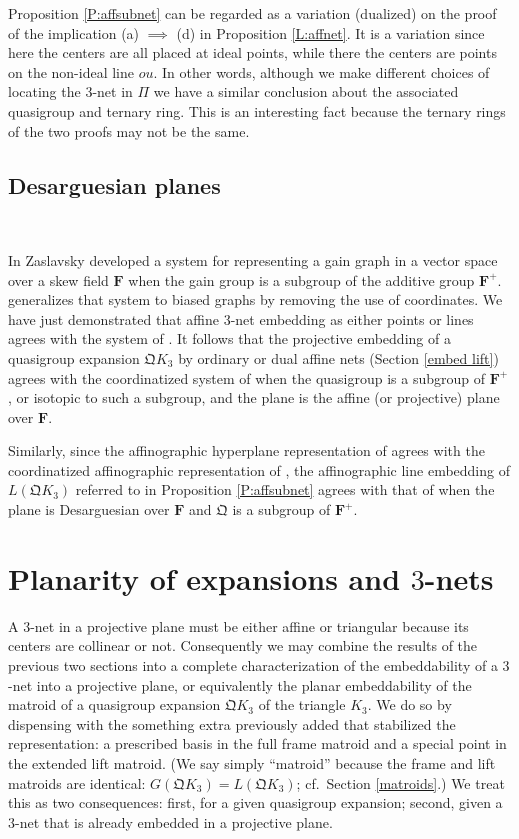 \documentclass[reqno,12pt]{amsart}
\newcommand \comment[1]{}				%
\theoremstyle{remark}
\numberwithin{equation}{section}
\numberwithin{figure}{section}
\newcommand\fF{\mathbf{F}}	%
\newcommand \fQ{\mathfrak Q}
\newcommand\PP{\Pi}	%
\newcommand\ortho{\cite[Section 3\comment{ortho}]{BG6} }		%
\newcommand\orthoaffino{\cite[Section 3.2\comment{orthoaffino}]{BG6} }	%
\begin{document}
Proposition \ref{P:affsubnet} can be regarded as a variation (dualized) on the proof of the implication (a) $\implies$ (d) in Proposition \ref{L:affnet}.  It is a variation since here the centers are all placed at ideal points, while there the centers are points on the non-ideal line $ou$.  In other words, although we make different choices of locating the $3$-net in $\PP$ we have a similar conclusion about the associated quasigroup and ternary ring.  This is an interesting fact because the ternary rings of the two proofs may not be the same.


\subsection{Desarguesian planes}\label{q desarglift}\

In \cite[Section IV.4.1]{BG} Zaslavsky developed a system for representing a gain graph in a vector space over a skew field $\fF$ when the gain group is a subgroup of the additive group $\fF^+$.  \ortho generalizes that system to biased graphs by removing the use of coordinates.  We have just demonstrated that affine $3$-net embedding as either points or lines agrees with the system of \ortho.  It follows that the projective embedding of a quasigroup expansion $\fQ K_3$ by ordinary or dual affine nets (Section \ref{embed lift}) agrees with the coordinatized system of \cite[Section IV.4.1]{BG} when the quasigroup is a subgroup of $\fF^+$, or isotopic to such a subgroup, and the plane is the affine (or projective) plane over $\fF$.

Similarly, since the affinographic hyperplane representation of \orthoaffino agrees with the coordinatized affinographic representation of \cite[Corollary IV.4.5]{BG}, the affinographic line embedding of $L(\fQ K_3)$ referred to in Proposition \ref{P:affsubnet} agrees with that of \cite[Corollary IV.4.5]{BG} when the plane is Desarguesian over $\fF$ and $\fQ$ is a subgroup of $\fF^+$.





\section{Planarity of expansions and $3$-nets}\label{q planar}

A $3$-net in a projective plane must be either affine or triangular because its centers are collinear or not.  Consequently we may combine the results of the previous two sections into a complete characterization of the embeddability of a $3$-net into a projective plane, or equivalently the planar embeddability of the matroid of a quasigroup expansion $\fQ K_3$ of the triangle $K_3$.
We do so by dispensing with the something extra previously added that stabilized the representation: a prescribed basis in the full frame matroid and a special point in the extended lift matroid.  (We say simply ``matroid'' because the frame and lift matroids are identical: $G(\fQ K_3) = L(\fQ K_3)$; cf.\ Section \ref{matroids}.)  We treat this as two consequences: first, for a given quasigroup expansion; second, given a $3$-net that is already embedded in a projective plane.
\end{document}
